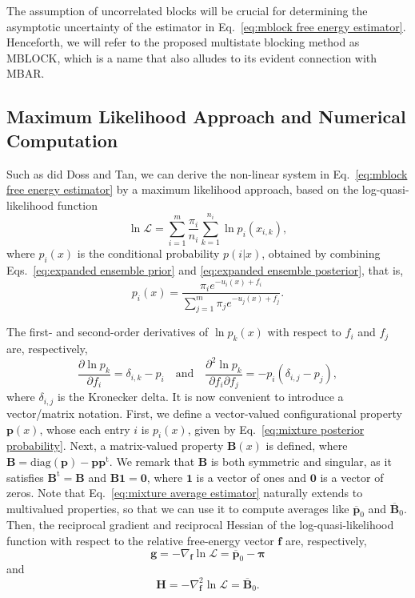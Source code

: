 \documentclass[aip,jcp,reprint,amsmath,amssymb]{revtex4-1}
\newcommand{\mt}[1]{\boldsymbol{\mathbf{#1}}}           %
\newcommand{\vt}[1]{\boldsymbol{\mathbf{#1}}}           %
\newcommand{\tr}[1]{#1^\text{t}}                        %
\begin{document}
The assumption of uncorrelated blocks will be crucial for determining the asymptotic uncertainty of the estimator in Eq.~\eqref{eq:mblock free energy estimator}. Henceforth, we will refer to the proposed multistate blocking method as MBLOCK, which is a name that also alludes to its evident connection with MBAR.

\subsection{Maximum Likelihood Approach and Numerical Computation}

Such as did Doss and Tan,\cite{Doss_2014} we can derive the non-linear system in Eq.~\eqref{eq:mblock free energy estimator} by a maximum likelihood approach, based on the log-quasi-likelihood function\cite{Doss_2014, Tan_2015, Roy_2018}
\begin{equation}
\label{eq:mblock log-quasi-likelihood}
\ln \mathcal L = \sum_{i=1}^m \frac{\pi_i}{n_i} \sum_{k=1}^{n_i} \ln p_i(x_{i,k}),
\end{equation}
where $p_i(x)$ is the conditional probability $p(i|x)$, obtained by combining Eqs.~\eqref{eq:expanded ensemble prior} and \eqref{eq:expanded ensemble posterior}, that is,
\begin{equation}
\label{eq:mixture posterior probability}
p_i(x) = \frac{\pi_i e^{-u_i(x) + f_i}}{\sum_{j=1}^m \pi_j e^{-u_j(x) + f_j}}.
\end{equation}

The first- and second-order derivatives of $\ln p_k(x)$ with respect to $f_i$ and $f_j$ are, respectively,
\begin{equation*}
\frac{\partial \ln p_k}{\partial f_i} = \delta_{i,k} - p_i \quad \text{and} \quad \frac{\partial^2\ln p_k}{\partial f_i \partial f_j} = -p_i(\delta_{i,j} - p_j),
\end{equation*}
where $\delta_{i,j}$ is the Kronecker delta. It is now convenient to introduce a vector/matrix notation. First, we define a vector-valued configurational property $\vt p(x)$, whose each entry $i$ is $p_i(x)$, given by Eq.~\eqref{eq:mixture posterior probability}. Next, a matrix-valued property $\mt B(x)$ is defined, where $\mt B = \text{diag}(\vt p) - {\vt p}\tr{\vt p}$. We remark that $\mt B$ is both symmetric and singular, as it satisfies $\tr{\mt B} = \mt B$ and $\mt B\vt 1 = \vt 0$, where $\vt 1$ is a vector of ones and $\vt 0$ is a vector of zeros. Note that Eq.~\eqref{eq:mixture average estimator} naturally extends to multivalued properties, so that we can use it to compute averages like $\overline{\vt p}_0$ and $\overline{\mt B}_0$. Then, the reciprocal gradient and reciprocal Hessian of the log-quasi-likelihood function with respect to the relative free-energy vector $\vt f$ are, respectively,
\begin{equation}
\label{eq:mblock score vector}
\vt g = -\nabla_{\vt f} \ln \mathcal L = \overline{\vt p}_0 - \vt \pi
\end{equation}
and
\begin{equation}
\label{eq:mblock fisher information matrix}
\mt H = -\nabla^2_{\vt f} \ln \mathcal L = \overline{\mt B}_0.
\end{equation}
\end{document}

